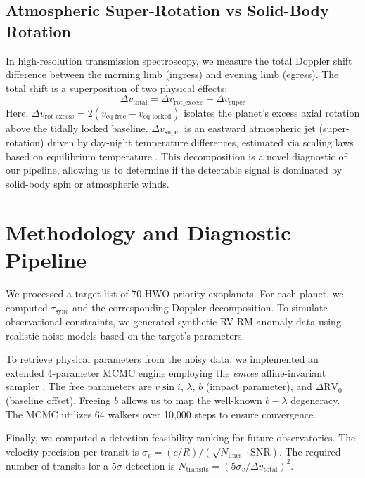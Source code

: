 \documentclass[a4paper,11pt]{article}
\numberwithin{equation}{section}
\begin{document}
\subsection{Atmospheric Super-Rotation vs Solid-Body Rotation}
In high-resolution transmission spectroscopy, we measure the total Doppler shift difference between the morning limb (ingress) and evening limb (egress). The total shift is a superposition of two physical effects:
\begin{equation}
    \Delta v_{\text{total}} = \Delta v_{\text{rot\_excess}} + \Delta v_{\text{super}}
\end{equation}
Here, $\Delta v_{\text{rot\_excess}} = 2(v_{\text{eq\_free}} - v_{\text{eq\_locked}})$ isolates the planet's excess axial rotation above the tidally locked baseline. $\Delta v_{\text{super}}$ is an eastward atmospheric jet (super-rotation) driven by day-night temperature differences, estimated via scaling laws based on equilibrium temperature \citep{Showman2002}. This decomposition is a novel diagnostic of our pipeline, allowing us to determine if the detectable signal is dominated by solid-body spin or atmospheric winds.

\section{Methodology and Diagnostic Pipeline}
\label{sec:methods}

We processed a target list of 70 HWO-priority exoplanets. For each planet, we computed $\tau_{\text{sync}}$ and the corresponding Doppler decomposition. To simulate observational constraints, we generated synthetic RV RM anomaly data using realistic noise models based on the target's parameters.

To retrieve physical parameters from the noisy data, we implemented an extended 4-parameter MCMC engine employing the \textit{emcee} affine-invariant sampler \citep{ForemanMackey2013}. The free parameters are $v \sin i$, $\lambda$, $b$ (impact parameter), and $\Delta \text{RV}_0$ (baseline offset). Freeing $b$ allows us to map the well-known $b-\lambda$ degeneracy. The MCMC utilizes 64 walkers over 10,000 steps to ensure convergence.

Finally, we computed a detection feasibility ranking for future observatories. The velocity precision per transit is $\sigma_v = (c/R) / (\sqrt{N_{\text{lines}}} \cdot \text{SNR})$. The required number of transits for a $5\sigma$ detection is $N_{\text{transits}} = (5 \sigma_v / \Delta v_{\text{total}})^2$.
\end{document}
